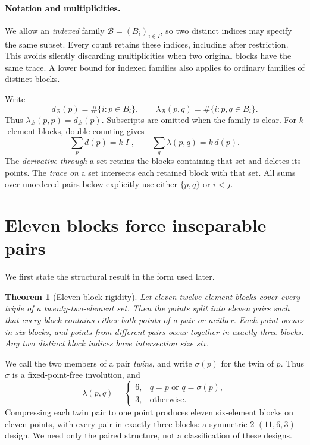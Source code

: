 \documentclass[11pt,letterpaper]{article}
\newtheorem{theorem}{Theorem}[section]
\theoremstyle{definition}\newtheorem{definition}[theorem]{Definition}
\theoremstyle{remark}\newtheorem{remark}[theorem]{Remark}
\newcommand{\calB}{\mathcal B}
\newcommand{\lam}{\lambda}
\begin{document}
\paragraph{Notation and multiplicities.}
We allow an \emph{indexed} family $\calB=(B_i)_{i\in I}$, so two distinct indices may specify the same subset. Every count retains these indices, including after restriction. This avoids silently discarding multiplicities when two original blocks have the same trace. A lower bound for indexed families also applies to ordinary families of distinct blocks.

Write
\[
 d_{\calB}(p)=\#\{i:p\in B_i\},\qquad
 \lam_{\calB}(p,q)=\#\{i:p,q\in B_i\}.
\]
Thus $\lam_{\calB}(p,p)=d_{\calB}(p)$. Subscripts are omitted when the family is clear. For $k$-element blocks, double counting gives
\begin{equation}\label{eq:counts}
 \sum_p d(p)=k|I|,
 \qquad \sum_q\lam(p,q)=k\,d(p).
\end{equation}
The \emph{derivative through} a set retains the blocks containing that set and deletes its points. The \emph{trace on} a set intersects each retained block with that set. All sums over unordered pairs below explicitly use either $\{p,q\}$ or $i<j$.

\section{Eleven blocks force inseparable pairs}\label{sec:rigidity}
We first state the structural result in the form used later.

\begin{theorem}[Eleven-block rigidity]\label{thm:rigidity}
Let eleven twelve-element blocks cover every triple of a twenty-two-element set. Then the points split into eleven pairs such that every block contains either both points of a pair or neither. Each point occurs in six blocks, and points from different pairs occur together in exactly three blocks. Any two distinct block indices have intersection size six.
\end{theorem}

We call the two members of a pair \emph{twins}, and write $\sigma(p)$ for the twin of $p$. Thus $\sigma$ is a fixed-point-free involution, and
\begin{equation}\label{eq:twin-codegree}
 \lam(p,q)=
 \begin{cases}
 6,&q=p\text{ or }q=\sigma(p),\\
 3,&\text{otherwise}.
 \end{cases}
\end{equation}
Compressing each twin pair to one point produces eleven six-element blocks on eleven points, with every pair in exactly three blocks: a symmetric $2$-$(11,6,3)$ design. We need only the paired structure, not a classification of these designs.
\end{document}
